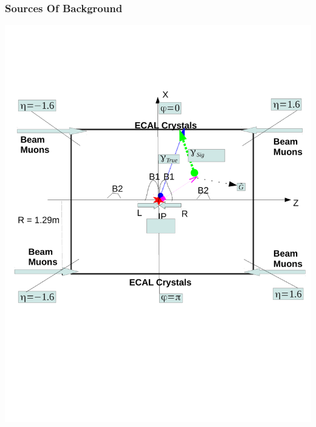 \documentclass{beamer}
\begin{document}
\begin{frame}
\frametitle{Sources Of Background}
  \begin{minipage}[t]{0.8\linewidth}
   \includegraphics[width=\textwidth]{THESISPLOTS/Background_Delayed_Photon.pdf}
  \end{minipage}
\end{frame}
\end{document}
